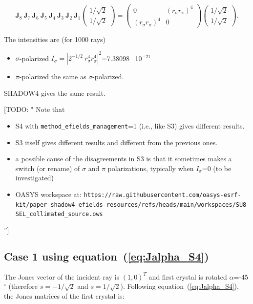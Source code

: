 \documentclass{iucr}
\newcommand{\todo}[1]{{\color{red}[TODO: "#1'']}}
\begin{document}
\begin{equation}\label{eq:JVcase2}
\textbf{J}_8~\textbf{J}_7~\textbf{J}_6~\textbf{J}_5~\textbf{J}_4~\textbf{J}_3~\textbf{J}_2~\textbf{J}_1
    \begin{pmatrix}
    1/\sqrt{2}\\1/\sqrt{2}
    \end{pmatrix}=
\begin{pmatrix}
  0 & (r_\sigma r_\pi)^4 \\
  (r_\sigma r_\pi)^4 & 0
\end{pmatrix}    \begin{pmatrix}
    1/\sqrt{2}\\1/\sqrt{2}
    \end{pmatrix}.
\end{equation}

The intensities are (for 1000 rays)
\begin{itemize}
    \item $\sigma$-polarized $I_\sigma=|2^{-1/2}~r_\sigma^4 r_\pi^4|^2$=7.38098~ 10$^{-21}$
    \item $\pi$-polarized the same as $\sigma$-polarized.
\end{itemize}

SHADOW4 gives the same result.

\todo{
Note that 
\begin{itemize}
    \item S4 with {\tt method\_efields\_management}=1 (i.e., like S3) gives different results. 
    \item S3 itself gives different results and different from the previous ones.
    \item a possible cause of the disagreements in S3 is that it sometimes makes a switch (or rename) of $\sigma$ and $\pi$ polarizations, typically when $I_\sigma$=0 (to be investigated)
    \item OASYS workspace at: {\tt https://raw.githubusercontent.com/oasys-esrf-kit/paper-shadow4-efields-resources/refs/heads/main/workspaces/SU8-SEL\_collimated\_source.ows} 
\end{itemize}
}


\subsection{Case 1 using equation~(\ref{eq:Jalpha_S4})}
The Jones vector of the incident ray is $(1,0)^T$ and first crystal is rotated $\alpha$=-45$^\circ$ (therefore $s=-1/\sqrt{2}$ and $s=1/\sqrt{2}$). Following equation~(\ref{eq:Jalpha_S4}), the Jones matrices of the first crystal is: 
\end{document}
